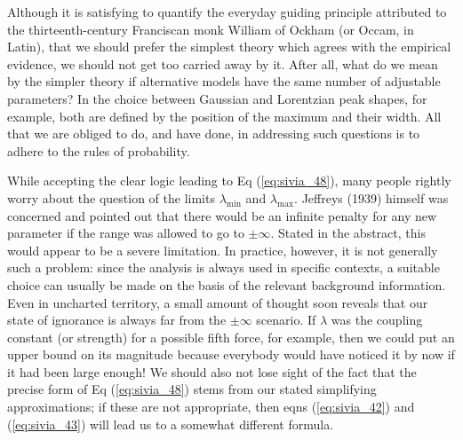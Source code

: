 \documentclass[%
oneside,                 %
final,                   %
10pt]{article}
\begin{document}
Although it is satisfying to quantify the everyday guiding principle attributed to the thirteenth-century Franciscan monk William of Ockham (or Occam, in Latin), that we should prefer the simplest theory which agrees with the empirical evidence, we should not get too carried away by it. After all, what do we mean by the simpler theory if alternative models have the same number of adjustable parameters? In the choice between Gaussian and Lorentzian peak shapes, for example, both are defined by the position of the maximum and their width. All that we are obliged to do, and have done, in addressing such questions is to adhere to the rules of probability.

While accepting the clear logic leading to Eq (\ref{eq:sivia_48}), many people rightly worry about the question of the limits $\lambda_\mathrm{min}$ and $\lambda_\mathrm{max}$. Jeffreys (1939) himself was concerned and pointed out that there would be an infinite penalty for any new parameter if the range was allowed to go to $\pm\infty$. Stated in the abstract, this would appear to be a severe limitation. In practice, however, it is not generally such a problem: since the analysis is always used in specific contexts, a suitable choice can usually be made on the basis of the relevant background information. Even in uncharted territory, a small amount of thought soon reveals that our state of ignorance is always far from the $\pm\infty$ scenario. If $\lambda$ was the coupling constant (or strength) for a possible fifth force, for example, then we could put an upper bound on its magnitude because everybody would have noticed it by now if it had been large enough! We should also not lose sight of the fact that the precise form of Eq (\ref{eq:sivia_48}) stems from our stated simplifying approximations; if these are not appropriate, then eqns (\ref{eq:sivia_42}) and (\ref{eq:sivia_43}) will lead us to a somewhat different formula.
\end{document}
